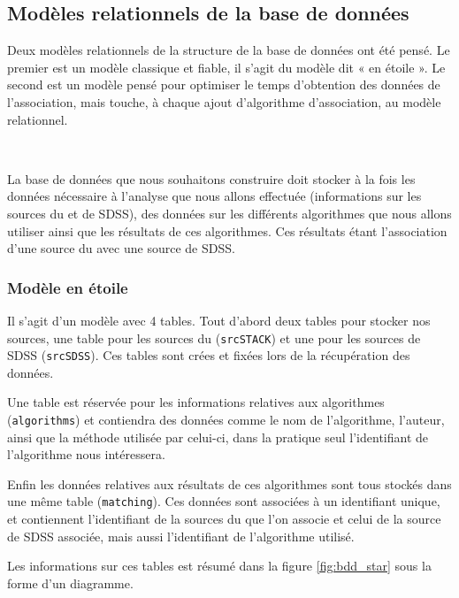 	\subsection{Modèles relationnels de la base de données}

Deux modèles relationnels de la structure de la base de données ont été pensé. Le premier est un modèle classique et fiable, il s'agit du modèle dit « en étoile ». Le second est un modèle pensé pour optimiser le temps d'obtention des données de l'association, mais touche, à chaque ajout d'algorithme d'association, au modèle relationnel.

\ 

La base de données que nous souhaitons construire doit stocker à la fois les données nécessaire à l'analyse que nous allons effectuée (informations sur les sources du \stack{} et de SDSS), des données sur les différents algorithmes que nous allons utiliser ainsi que les résultats de ces algorithmes. Ces résultats étant l'association d'une source du \stack{} avec une source de SDSS.

		\subsubsection{Modèle en étoile}

Il s'agit d'un modèle avec 4 tables. Tout d'abord deux tables pour stocker nos sources, une table pour les sources du \stack{} (\texttt{srcSTACK}) et une pour les sources de SDSS (\texttt{srcSDSS}). Ces tables sont crées et fixées lors de la récupération des données.

Une table est réservée pour les informations relatives aux algorithmes (\texttt{algorithms}) et contiendra des données comme le nom de l'algorithme, l'auteur, ainsi que la méthode utilisée par celui-ci, dans la pratique seul l'identifiant de l'algorithme nous intéressera.

Enfin les données relatives aux résultats de ces algorithmes sont tous stockés dans une même table (\texttt{matching}). Ces données sont associées à un identifiant unique, et contiennent l'identifiant de la sources du \stack{} que l'on associe et celui de la source de SDSS associée, mais aussi l'identifiant de l'algorithme utilisé.

Les informations sur ces tables est résumé dans la figure \ref{fig:bdd_star} sous la forme d'un diagramme.

